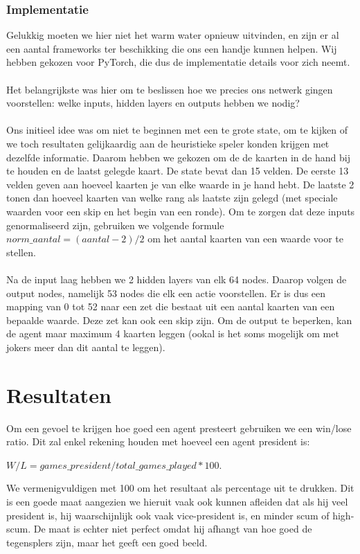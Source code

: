 \documentclass[11pt]{article}
\begin{document}
\subsubsection{Implementatie}
Gelukkig moeten we hier niet het warm water opnieuw uitvinden, en zijn er al een aantal frameworks ter beschikking die ons een handje kunnen helpen. Wij hebben gekozen voor PyTorch, die dus de implementatie details voor zich neemt.\\\\
Het belangrijkste was hier om te beslissen hoe we precies ons netwerk gingen voorstellen: welke inputs, hidden layers en outputs hebben we nodig?\\\\
Ons initieel idee was om niet te beginnen met een te grote state, om te kijken of we toch resultaten gelijkaardig aan de heuristieke speler konden krijgen met dezelfde informatie. Daarom hebben we gekozen om de de kaarten in de hand bij te houden en de laatst gelegde kaart. De state bevat dan 15 velden. De eerste 13 velden geven aan hoeveel kaarten je van elke waarde in je hand hebt. De laatste 2 tonen dan hoeveel kaarten van welke rang als laatste zijn gelegd (met speciale waarden voor een skip en het begin van een ronde). Om te zorgen dat deze inputs genormaliseerd zijn, gebruiken we volgende formule $norm\_aantal = (aantal - 2)/2$ om het aantal kaarten van een waarde voor te stellen.\\\\
Na de input laag hebben we 2 hidden layers van elk 64 nodes. Daarop volgen de output nodes, namelijk 53 nodes die elk een actie voorstellen. Er is dus een mapping van 0 tot 52 naar een zet die bestaat uit een aantal kaarten van een bepaalde waarde. Deze zet kan ook een skip zijn. Om de output te beperken, kan de agent maar maximum 4 kaarten leggen (ookal is het soms mogelijk om met jokers meer dan dit aantal te leggen).\\

\section{Resultaten}
Om een gevoel te krijgen hoe goed een agent presteert gebruiken we een win/lose ratio. Dit zal enkel rekening houden met hoeveel een agent president is:
\begin{center}
$W/L = games\_president/total\_games\_played * 100$.
\end{center}
We vermenigvuldigen met 100 om het resultaat als percentage uit te drukken. Dit is een goede maat aangezien we hieruit vaak ook kunnen afleiden dat als hij veel president is, hij waarschijnlijk ook vaak vice-president is, en minder scum of high-scum. De maat is echter niet perfect omdat hij afhangt van hoe goed de tegensplers zijn, maar het geeft een goed beeld.
\end{document}
